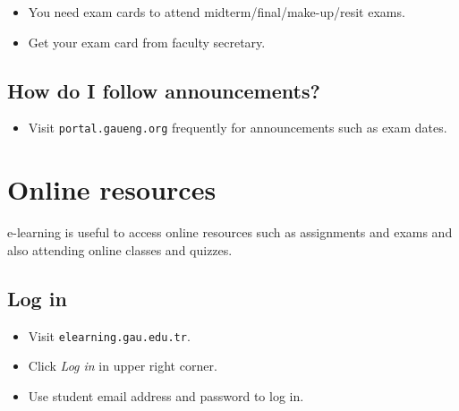 \documentclass{article}
\begin{document}
\begin{itemize}
	\item You need exam cards to attend midterm/final/make-up/resit exams.
	\item Get your exam card from faculty secretary.
\end{itemize}

\subsection{How do I follow announcements?}

\begin{itemize}
	\item Visit \texttt{portal.gaueng.org} frequently for announcements such as exam dates.
\end{itemize}







%

\section{Online resources}

e-learning is useful to access online resources such as assignments and exams and also attending online classes and quizzes.

\subsection{Log in}

\begin{itemize}
	\item Visit \texttt{elearning.gau.edu.tr}.
	\item Click \textit{Log in} in upper right corner.
	\item Use student email address and password to log in.
\end{itemize}
\end{document}
